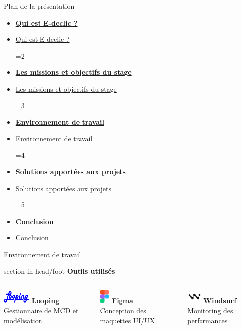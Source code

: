 \documentclass{beamer}
\newcommand{\planLine}[4]{
  \ifnum#1=#2
    \item \hyperlink{#3}{\textbf{\large #4}}
  \else
    \item \hyperlink{#3}{#4}
  \fi
}
\newcommand{\planSlide}[1]{
  	\begin{frame}{Plan de la présentation}
  		\begin{center}
  			\begin{minipage}{1\textwidth}
				\begin{itemize}
      			\planLine{#1}{1}{organisation}{Qui est E-declic ?}
      			\planLine{#1}{2}{sujet}{Les missions et objectifs du stage}
      			\planLine{#1}{3}{environnement}{Environnement de travail}
      			\planLine{#1}{4}{realisation}{Solutions apportées aux projets}
      			\planLine{#1}{5}{conclusion}{Conclusion}
	    		\end{itemize}
  		\end{minipage}
	\end{center}
	\vfill
	\end{frame}
}
\begin{document}
\planSlide{3}

\begin{frame}[label=environnement]{Environnement de travail}
	\begin{beamercolorbox}[wd=\paperwidth,ht=1.5em,dp=0.5em,leftskip=0.5cm]{section in head/foot}
  		\large \textbf{Outils utilisés}
	\end{beamercolorbox}
	\vspace{0.5em}
	\begin{center}
  		\begin{minipage}{0.9\textwidth}
  			\begin{columns}[T, onlytextwidth]
        				
        				\begin{minipage}[t][2cm][t]{\linewidth}
        					\raggedright
         				\includegraphics[width=1.35cm, height=0.75cm, keepaspectratio]{../img/logo_looping.png} 
         				\hspace{0.1cm} \textbf{Looping} \\ 
         				Gestionnaire de MCD et modélisation
          		  	\end{minipage}
          			\vspace{0.7em}
          			
        				\begin{minipage}[t][2cm][t]{\linewidth}
        					\raggedright
          				\includegraphics[height=0.75cm]{../img/logo_figma.png}
          				\hspace{0.95cm} \textbf{Figma} \\
          				Conception des maquettes UI/UX
          			\end{minipage}
          			\vspace{0.7em}
          		
          			\begin{minipage}[t][2cm][t]{\linewidth}
          				\raggedright
          				\includegraphics[width=0.75cm, height=0.75cm]{../img/logo_windsurf.png}
          				\hspace{0.6cm} \textbf{Windsurf} \\ 
          				Monitoring des performances
          			\end{minipage}
          			

\end{columns}
\end{minipage}
\end{center}
\end{frame}
\end{document}
